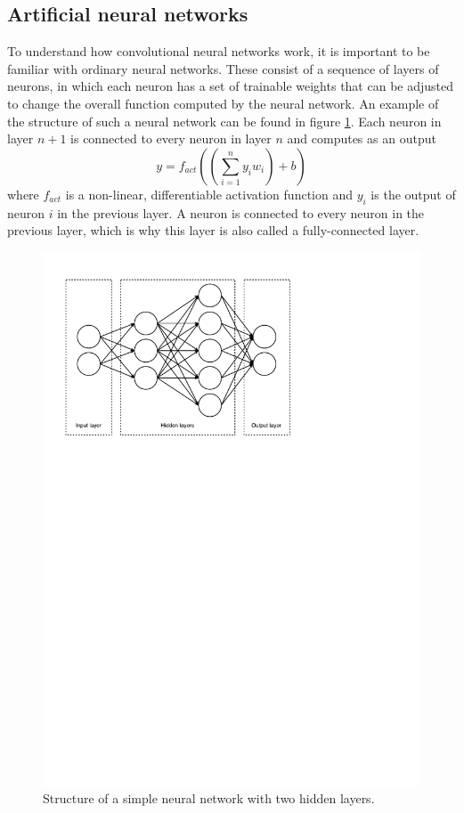 \documentclass[12pt,a4paper,twoside,openright]{report}
\begin{document}
\subsection{Artificial neural networks}
To understand how convolutional neural networks work, it is important to be familiar with ordinary neural networks. These consist of a sequence of layers of neurons, in which each neuron has a set of trainable weights that can be adjusted to change the overall function computed by the neural network. An example of the structure of such a neural network can be found in figure \ref{fig:nn_layout}. Each neuron in layer $n+1$ is connected to every neuron in layer $n$ and computes as an output
\[y = f_{act}((\sum_{i=1}^{n} y_i w_i) + b)\]
where $f_{act}$ is a non-linear, differentiable activation function and $y_i$ is the output of neuron $i$ in the previous layer. A neuron is connected to every neuron in the previous layer, which is why this layer is also called a fully-connected layer.

\begin{figure}
	\centering
	\includegraphics[scale=0.6]{nn_layout}
	\caption{Structure of a simple neural network with two hidden layers.}
	\label{fig:nn_layout}
\end{figure}
\end{document}
